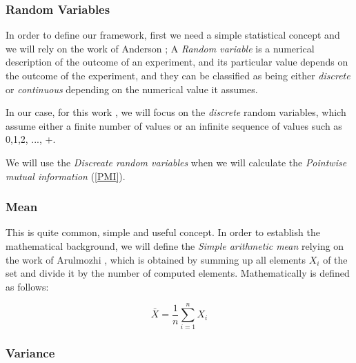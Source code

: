 \subsubsection{Random Variables}\label{RandomVariable}

In order to define our framework, first we need a simple statistical concept and we will rely on the work of Anderson \cite{AN2011}; A \emph{Random variable} is a numerical description of the outcome of an experiment, and its particular value depends on the outcome of the experiment, and they can be classified as being either \emph{discrete} or \emph{continuous} depending on the numerical value it assumes.

In our case, for this work , we will focus on the \emph{discrete} random variables, which assume either a finite number of values or an infinite sequence of values such as 0,1,2, ..., +\infty.

We will use the \emph{Discreate random variables} when we will calculate the \emph{Pointwise mutual information} (\ref{PMI}).

 \subsubsection{Mean}\label{mean}

This is quite common, simple and useful concept. In order to establish the mathematical background, we will define the \emph{Simple arithmetic mean} relying on the work of Arulmozhi \cite{ARU2009}, which is obtained by summing up all elements \begin{math}X_{i}\end{math} of the set and divide it by the number of computed elements. Mathematically is defined as follows:

\begin{equation} \label{eq:Mean}
	\bar{X} = \frac{1}{n} \sum ^n _{i=1}X_i
\end{equation}

\subsubsection{Variance}\label{variance}

